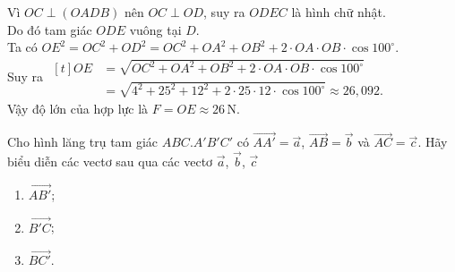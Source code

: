 \begin{bt}
{	}
	\noindent
	Vì $OC \perp (OADB)$ nên $OC \perp OD$, suy ra $ODEC$ là hình chữ nhật.\\
	Do đó tam giác $ODE$ vuông tại $D$.\\
	Ta có $OE^2=OC^2+OD^2=OC^2+OA^2+OB^2+2\cdot OA\cdot OB\cdot\cos 100^{\circ}$.\\
	Suy ra 
	$\begin{aligned}[t]
		OE
		&=\sqrt{OC^2+OA^2+OB^2+2\cdot OA\cdot OB\cdot\cos 100^{\circ}}\\
		&=\sqrt{4^2+25^2+12^2+2\cdot 25\cdot 12\cdot \cos 100^{\circ}} \approx 26{,}092.
	\end{aligned}$\\
	Vậy độ lớn của hợp lực là $F=OE \approx 26 \mathrm{\,N}$.
\end{bt}

\begin{bt}%
	Cho hình lăng trụ tam giác $A B C.A' B' C'$ có $\overrightarrow{A A'}=\overrightarrow{a}$, $\overrightarrow{A B}=\overrightarrow{b}$ và $\overrightarrow{A C}=\overrightarrow{c}$. Hãy biểu diễn các vectơ sau qua các vectơ $\overrightarrow{a}$, $\overrightarrow{b}$, $\overrightarrow{c}$
	\begin{enumerate}
		\item  $\overrightarrow{A B'}$;
		\item  $\overrightarrow{B'C}$;
		\item  $\overrightarrow{B C'}$.
	\end{enumerate}
\end{bt}
